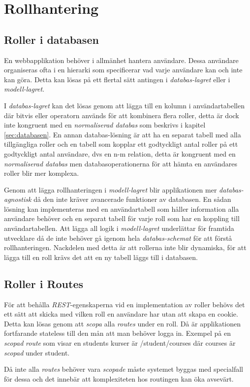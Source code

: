 \section{Rollhantering}

\subsection{Roller i databasen}

En webbapplikation behöver i allmänhet hantera användare. Dessa användare organiseras ofta i en hierarki som specificerar vad varje användare kan och inte kan göra. Detta kan lösas på ett flertal sätt antingen i \emph{databas-lagret} eller i \emph{modell-lagret}.

I \emph{databas-lagret} kan det lösas genom att lägga till en kolumn i användartabellen där bitvis eller 
operatorn används för att kombinera flera roller, detta är dock inte kongruent med en \emph{normaliserad databas} som beskrivs i kapitel \ref{sec:databasen}. En annan databas-lösning är att ha en separat tabell med alla tillgängliga roller och en tabell som kopplar ett godtyckligt antal roller på ett godtyckligt antal användare, dvs en n-m relation, detta är kongruent med en \emph{normaliserad databas} men databasoperationerna för att hämta en användares roller blir mer komplexa.

Genom att lägga rollhanteringen i \emph{modell-lagret} blir applikationen mer \emph{databas-agnostisk} då den inte kräver avancerade funktioner av databasen. En sådan lösning kan implementeras med en användartabell som håller information alla användare behöver och en separat tabell för varje roll som har en koppling till användartabellen. Att lägga all logik i \emph{modell-lagret} underlättar för framtida utvecklare då de inte behöver gå igenom hela \emph{databas-schemat} för att förstå rollhanteringen. Nackdelen med detta är att rollerna inte blir dynamiska, för att lägga till en roll krävs det att en ny tabell läggs till i databasen.

\subsection{Roller i Routes}

För att behålla \emph{REST}-egenskaperna vid en implementation av roller behövs det ett sätt att skicka med vilken roll en användare har utan att skapa en cookie. Detta kan lösas genom att \emph{scopa} alla \emph{routes} under en roll. Då är applikationen fortfarande stateless till den mån att man behöver logga in. 
Exempel på en \emph{scopad} \emph{route} som visar en students kurser är /student/courses där courses är \emph{scopad} under student.

Då inte alla \emph{routes} behöver vara \emph{scopade} måste systemet byggas med specialfall för dessa och det innebär att komplexiteten hos routingen kan öka avsevärt.
